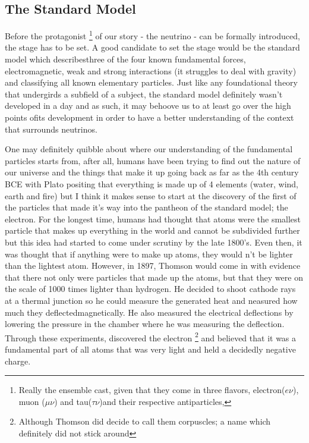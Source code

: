 \subsection{The Standard Model}

Before the protagonist
\footnote{Really the ensemble cast, given that they come in three flavors, electron($e\nu$), muon ($\mu \nu$) and tau($\tau \nu$)and their respective antiparticles,}
of our story - the neutrino - can be formally introduced, the stage has to be set.
A good candidate to set the stage would be the standard model which describesthree of the four known fundamental forces, electromagnetic, weak and strong interactions (it struggles to deal with  gravity) and classifying all known elementary particles.
Just like any foundational theory that undergirds a subfield of a subject, the standard model definitely wasn't developed in a day and as such, it may behoove us to at least go over the high points ofits development in order to have a better understanding of the context that surrounds neutrinos.

One may definitely quibble about where our understanding of the fundamental particles starts from, after all, humans have been trying to find out the nature of our universe and the things that make it up going back as far as the 4th century BCE with Plato positing that everything is made up of 4 elements (water, wind, earth and fire)\cite{Timaeus} but I think it makes sense to start at the discovery of the first of the particles that made it's way into the pantheon of the standard model; the electron.
For the longest time, humans had thought that atoms were the smallest particle that makes up everything in the world and cannot be subdivided further\cite{Dalton} but this idea had started to come under scrutiny by the late 1800's.
Even then, it was thought that if anything were to make up atoms, they would n't be lighter than the lightest atom.
However, in 1897, Thomson would come in with evidence that there not only were particles that made up the atoms, but that they were on the scale of 1000 times lighter  than hydrogen.
He decided to shoot cathode rays at a thermal junction so he could measure the generated heat and neasured how much they deflectedmagnetically.
He also measured the electrical deflections by lowering the pressure in the chamber where he was measuring the deflection.
Through these experiments, discovered the electron
\footnote{Although Thomson did decide to call them corpuscles; a name which definitely did not stick around}
and believed that it was a fundamental part of all atoms that was very light and held a decidedly negative charge.\cite{electronDiscovery}

